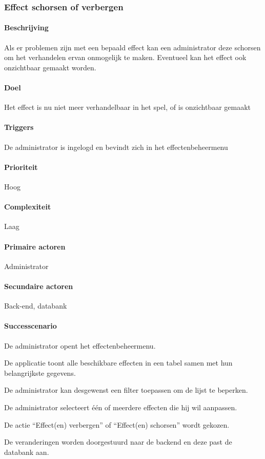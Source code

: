 \subsubsection{Effect schorsen of verbergen}
\begin{compact}
\paragraph{Beschrijving} Als er problemen zijn met een bepaald effect kan een administrator deze schorsen om het verhandelen ervan onmogelijk te maken. Eventueel kan het effect ook onzichtbaar gemaakt worden.
\paragraph{Doel} Het effect is nu niet meer verhandelbaar in het spel, of is onzichtbaar gemaakt
\paragraph{Triggers}De administrator is ingelogd en bevindt zich in het effectenbeheermenu
\paragraph{Prioriteit}Hoog
\paragraph{Complexiteit}Laag
\paragraph{Primaire actoren}Administrator
\paragraph{Secundaire actoren}Back-end, databank
\paragraph{Successcenario}
\begin{enumerate_compact}
 \item De administrator opent het effectenbeheermenu.
 \item De applicatie toont alle beschikbare effecten in een tabel samen met hun belangrijkste gegevens.
 \item De administrator kan desgewenst een filter toepassen om de lijst te beperken.
 \item De administrator selecteert \'e\'en of meerdere effecten die hij wil aanpassen.
 \item De actie ``Effect(en) verbergen'' of ``Effect(en) schorsen'' wordt gekozen.
 \item De veranderingen worden doorgestuurd naar de backend en deze past de databank aan.
\end{enumerate_compact}

\end{compact}
